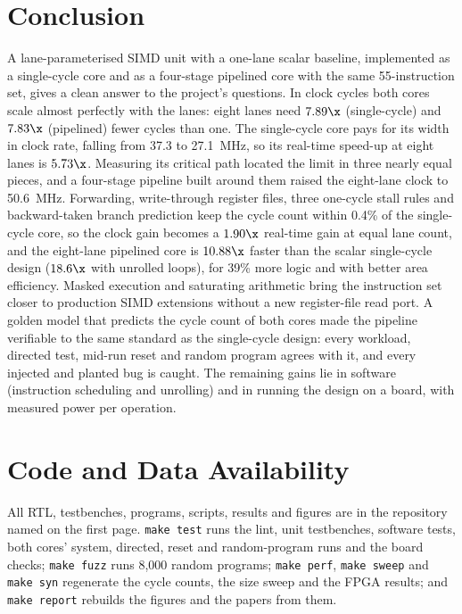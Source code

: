 \section{Conclusion}\label{sec:conclusion}
A lane-parameterised SIMD unit with a one-lane scalar baseline, implemented as a
single-cycle core and as a four-stage pipelined core with the same 55-instruction set,
gives a clean answer to the project's questions. In clock cycles both cores scale almost
perfectly with the lanes: eight lanes need $7.89\x$ (single-cycle) and $7.83\x$
(pipelined) fewer cycles than one. The single-cycle core pays for its width in clock
rate, falling from 37.3 to 27.1~MHz, so its real-time speed-up at eight lanes is $5.73\x$.
Measuring its critical path located the limit in three nearly equal pieces, and a
four-stage pipeline built around them raised the eight-lane clock to 50.6~MHz.
Forwarding, write-through register files, three one-cycle stall rules and
backward-taken branch prediction keep the cycle count within 0.4\% of the single-cycle
core, so the clock gain becomes a $1.90\x$ real-time gain at equal lane count, and the
eight-lane pipelined core is $10.88\x$ faster than the scalar single-cycle design
($18.6\x$ with unrolled loops), for 39\% more logic and with better area efficiency.
Masked execution and saturating arithmetic bring the instruction set closer to
production SIMD extensions without a new register-file read port. A golden model that
predicts the cycle count of both cores made the pipeline verifiable to the same standard
as the single-cycle design: every workload, directed test, mid-run reset and random
program agrees with it, and every injected and planted bug is caught. The remaining
gains lie in software (instruction scheduling and unrolling) and in running the design
on a board, with measured power per operation.

\section*{Code and Data Availability}
All RTL, testbenches, programs, scripts, results and figures are in the repository
named on the first page. \texttt{make test} runs the lint, unit testbenches, software
tests, both cores' system, directed, reset and random-program runs and the board checks;
\texttt{make fuzz} runs 8,000 random programs; \texttt{make perf}, \texttt{make sweep}
and \texttt{make syn} regenerate the cycle counts, the size sweep and the FPGA results;
and \texttt{make report} rebuilds the figures and the papers from them.

